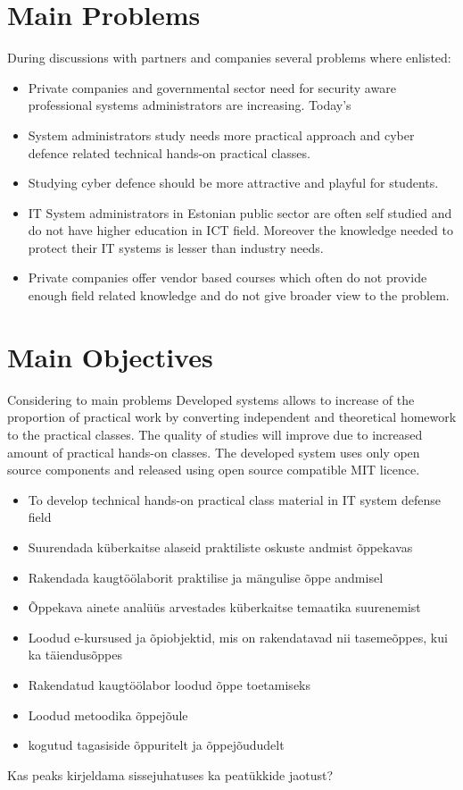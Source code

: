 \section{Main Problems}
During discussions with partners and companies several problems where enlisted:
\begin{itemize}
\item Private companies and governmental sector need for security aware professional systems administrators are increasing. Today's 
\item System administrators study needs more practical approach and cyber defence related technical hands-on practical classes.
\item Studying cyber defence should be more attractive and playful for students.
\item IT System administrators in Estonian public sector are often self studied  and do not have higher education in ICT field. Moreover the knowledge needed to protect their IT systems is lesser than industry needs.
\item Private companies offer vendor based courses which often do not provide enough field related knowledge and do not give broader view to the problem.
\end{itemize}

\section{Main Objectives}
Considering to main problems
Developed systems allows to  increase of the proportion of practical work by converting independent and theoretical homework to  the practical classes. The quality of studies will improve due to increased amount of practical hands-on classes. The developed system uses only open source components and released using open source compatible MIT licence.
\begin{itemize}
	\item To develop technical hands-on practical class material in IT system defense field
	\item Suurendada küberkaitse alaseid praktiliste oskuste andmist õppekavas
	\item Rakendada kaugtöölaborit praktilise ja mängulise õppe andmisel
\end{itemize}


\begin{itemize}
	\item Õppekava ainete analüüs arvestades küberkaitse temaatika suurenemist
	\item Loodud e-kursused ja õpiobjektid, mis on rakendatavad nii tasemeõppes, kui ka täiendusõppes
	\item Rakendatud kaugtöölabor loodud õppe toetamiseks
	\item Loodud metoodika õppejõule
	\item kogutud tagasiside õppuritelt ja õppejõududelt
\end{itemize}



\par Kas peaks kirjeldama sissejuhatuses ka peatükkide jaotust?
